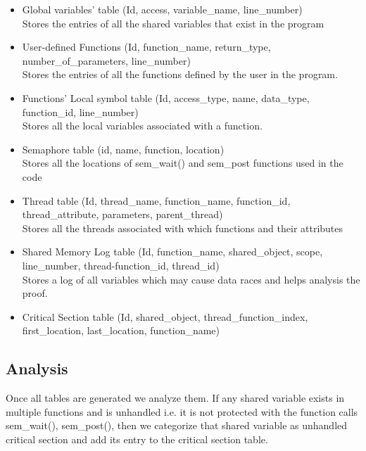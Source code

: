 \begin{itemize}
\item Global variables’ table (Id, access, variable\_name, line\_number)\\
Stores the entries of all the shared variables that exist in the program

\item User-defined Functions (Id, function\_name, return\_type, number\_of\_parameters, line\_number)\\
Stores the entries of all the functions defined by the user in the program.

\item Functions’ Local symbol table (Id, access\_type, name, data\_type, function\_id, line\_number)\\
Stores all the local variables associated with a function.

\item Semaphore table (id, name, function, location)\\
Stores all the locations of sem\_wait() and sem\_post functions used in the code

\item Thread table (Id, thread\_name, function\_name, function\_id, thread\_attribute, parameters, parent\_thread)\\
Stores all the threads associated with which functions and their attributes

\item Shared Memory Log table (Id, function\_name, shared\_object, scope, line\_number, thread-function\_id, thread\_id)\\
Stores a log of all variables which may cause data races and helps analysis the proof.

\item Critical Section table (Id, shared\_object, thread\_function\_index, first\_location, last\_location, function\_name)

\end{itemize}

\subsection{Analysis}
Once all tables are generated we analyze them. If any shared variable exists in multiple functions and is unhandled i.e. it is not protected with the function calls sem\_wait(), sem\_post(), then we categorize that shared variable as unhandled critical section and add its entry to the critical section table.

